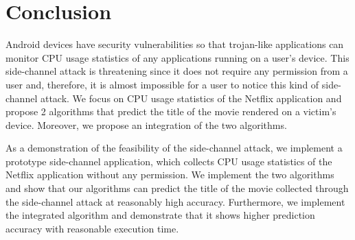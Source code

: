\section{Conclusion}

Android devices have security vulnerabilities so that trojan-like applications can monitor CPU usage statistics of any applications running on a user's device. 
This side-channel attack is threatening since it does not require any permission from a user and, therefore, it is almost impossible for a user to notice this kind of side-channel attack. 
We focus on CPU usage statistics of the Netflix application and propose 2 algorithms that predict the title of the movie rendered on a victim's device. 
Moreover, we propose an integration of the two algorithms.

As a demonstration of the feasibility of the side-channel attack, we implement a prototype side-channel application, which collects CPU usage statistics of the Netflix application without any permission.
We implement the two algorithms and show that our algorithms can predict the title of the movie collected through the side-channel attack at reasonably high accuracy.
Furthermore, we implement the integrated algorithm and demonstrate that it shows higher prediction accuracy with reasonable execution time.

